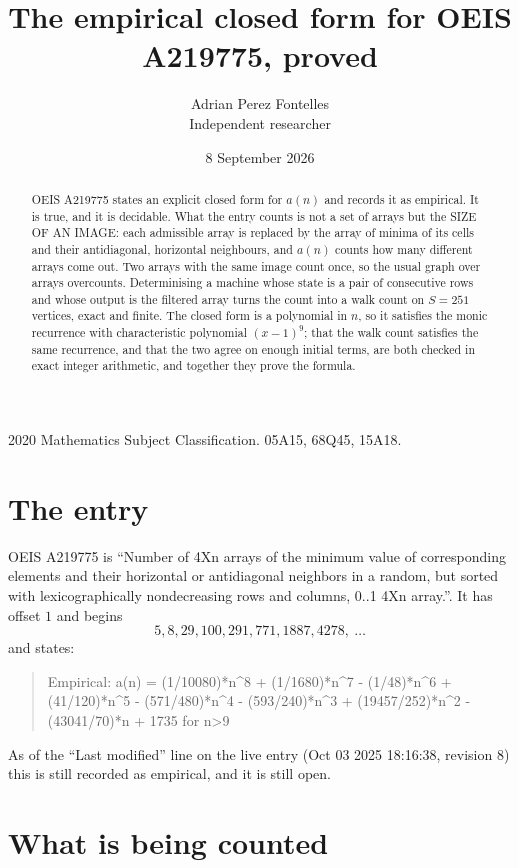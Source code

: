 \documentclass[11pt,a4paper]{article}
\title{The empirical closed form for OEIS A219775, proved}
\author{Adrian Perez Fontelles\\ \small Independent researcher}
\date{8 September 2026}
\theoremstyle{plain}
\theoremstyle{definition}
\begin{document}
\maketitle

\begin{abstract}
OEIS A219775 states an explicit closed form for $a(n)$ and records it as empirical. It is true, and
it is decidable. What the entry counts is not a set of arrays but the SIZE OF AN IMAGE: each
admissible array is replaced by the array of minima of its cells and their antidiagonal, horizontal neighbours,
and $a(n)$ counts how many different arrays come out. Two arrays with the same image count
once, so the usual graph over arrays overcounts. Determinising a machine whose state is a pair
of consecutive rows and whose output is the filtered array turns the count into a walk count on
$S=251$ vertices, exact and finite. The closed form is a polynomial in $n$, so it satisfies the
monic recurrence with characteristic polynomial $(x-1)^{9}$; that the walk count
satisfies the same recurrence, and that the two agree on enough initial terms, are both checked
in exact integer arithmetic, and together they prove the formula.
\end{abstract}

\noindent\small 2020 Mathematics Subject Classification. 05A15, 68Q45, 15A18.\normalsize

\section{The entry}

OEIS A219775 is ``Number of 4Xn arrays of the minimum value of corresponding elements and their horizontal or antidiagonal neighbors in a random, but sorted with lexicographically nondecreasing rows and columns, 0..1 4Xn array.''. It has offset $1$ and begins
\[
5, 8, 29, 100, 291, 771, 1887, 4278,\ \dots
\]
and states:
\begin{quote}
Empirical: a(n) = (1/10080)*n\^{}8 + (1/1680)*n\^{}7 - (1/48)*n\^{}6 + (41/120)*n\^{}5 - (571/480)*n\^{}4 - (593/240)*n\^{}3 + (19457/252)*n\^{}2 - (43041/70)*n + 1735 for n>9
\end{quote}
As of the ``Last modified'' line on the live entry (Oct 03 2025 18:16:38, revision 8)
this is still recorded as empirical, and it is still open.

\section{What is being counted}
\end{document}
